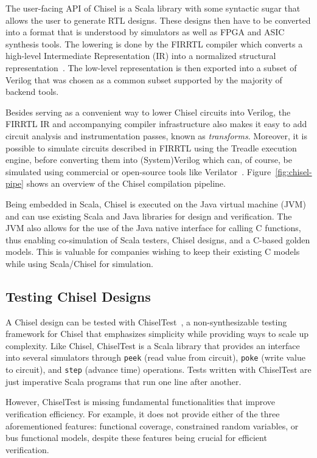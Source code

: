 \documentclass[conference]{IEEEtran}
\begin{document}
The user-facing API of Chisel is a Scala library with some syntactic sugar that allows the user to generate RTL designs.
These designs then have to be converted into a format that is understood by simulators as well as FPGA and ASIC synthesis tools.
The lowering is done by the FIRRTL compiler which converts a high-level Intermediate Representation (IR) into a normalized structural representation~\cite{firrtl}.
The low-level representation is then exported into a subset of Verilog that was chosen as a common subset supported by the majority of backend tools.

Besides serving as a convenient way to lower Chisel circuits into Verilog, the FIRRTL IR and accompanying compiler infrastructure
also makes it easy to add circuit analysis and instrumentation passes, known as \textit{transforms}. Moreover, it is possible to simulate circuits described in FIRRTL using the Treadle execution engine, before converting them into (System)Verilog which can, of course, be simulated using commercial or open-source tools like Verilator~\cite{verilator}. Figure~\ref{fig:chisel-pipe} shows an overview of the Chisel compilation pipeline.

Being embedded in Scala, Chisel is executed on the Java virtual machine (JVM) and can
use existing Scala and Java libraries for design and verification. 
The JVM also allows for the use of the Java native interface for calling C functions, 
thus enabling co-simulation of Scala testers, Chisel designs, and a C-based golden models. This is 
valuable for companies wishing to keep their existing C models while using Scala/Chisel for simulation.

\subsection{Testing Chisel Designs}
A Chisel design can be tested with ChiselTest~\cite{chiseltest}, a non-synthesizable 
testing framework for Chisel that emphasizes simplicity while providing ways to scale up 
complexity. Like Chisel, ChiselTest is a Scala library that provides an interface into several 
simulators through \texttt{peek} (read value from circuit), \texttt{poke} (write value to 
circuit), and \texttt{step} (advance time) operations. Tests written with ChiselTest are just 
imperative Scala programs that run one line after another.

However, ChiselTest is missing fundamental functionalities that improve verification efficiency. 
For example, it does not provide either of the three aforementioned features: functional 
coverage, constrained random variables, or bus functional models, despite these features being 
crucial for efficient verification.
\end{document}
